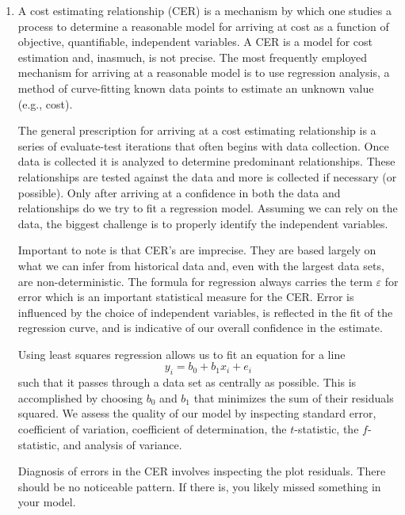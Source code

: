 \documentclass[letterpaper,10pt]{article}
\begin{document}
\begin{enumerate}
\item A cost estimating relationship (CER) is a mechanism by which one studies a process to determine a reasonable model for arriving at cost as a function of objective, quantifiable, independent variables.  A CER is a model for cost estimation and, inasmuch, is not precise.  The most frequently employed mechanism for arriving at a reasonable model is to use regression analysis, a method of curve-fitting known data points to estimate an unknown value (e.g., cost).
\par The general prescription for arriving at a cost estimating relationship is a series of evaluate-test iterations that often begins with data collection.  Once data is collected it is analyzed to determine predominant relationships.  These relationships are tested against the data and more is collected if necessary (or possible).  Only after arriving at a confidence in both the data and relationships do we try to fit a regression model.  Assuming we can rely on the data, the biggest challenge is to properly identify the independent variables.
\par Important to note is that CER's are imprecise.  They are based largely on what we can infer from historical data and, even with the largest data sets, are non-deterministic.  The formula for regression always carries the term $\varepsilon$ for error which is an important statistical measure for the CER.  Error is influenced by the choice of independent variables, is reflected in the fit of the regression curve, and is indicative of our overall confidence in the estimate.
\par Using least squares regression allows us to fit an equation for a line\[y_{i}=b_{0}+b_{1}x_{i}+e_{i}\]such that it passes through a data set as centrally as possible.  This is accomplished by choosing $b_{0}$ and $b_{1}$ that minimizes the sum of their residuals squared.  We assess the quality of our model by inspecting standard error, coefficient of variation, coefficient of determination, the $t$-statistic, the $f$-statistic, and analysis of variance.
\par Diagnosis of errors in the CER involves inspecting the plot residuals.  There should be no noticeable pattern.  If there is, you likely missed something in your model.
\end {enumerate}
\end{document}
